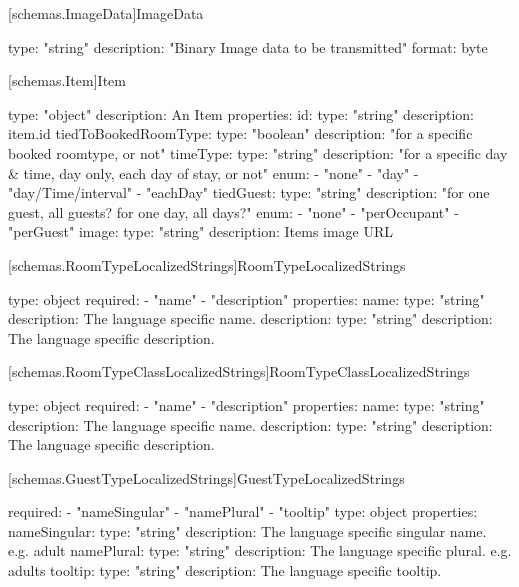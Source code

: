 [schemas.ImageData]{ImageData}
\begin{codeblock}
  type: "string"
  description: "Binary Image data to be transmitted"
  format: byte
\end{codeblock}

[schemas.Item]{Item}
\begin{codeblock}
  type: "object"
  description: An Item
  properties:
    id:
      type: "string"
      description: item.id
    tiedToBookedRoomType:
      type: "boolean"
      description: "for a specific booked roomtype, or not"
    timeType:
      type: "string"
      description: "for a specific day & time, day only, each day of stay, or not"
      enum:
      - "none"
      - "day"
      - "day/Time/interval"
      - "eachDay"
    tiedGuest:
      type: "string"
      description: "for one guest, all guests? for one day, all days?"
      enum:
      - "none"
      - "perOccupant"
      - "perGuest"
    image:
      type: "string"
      description: Items image URL
\end{codeblock}

[schemas.RoomTypeLocalizedStrings]{RoomTypeLocalizedStrings}
\begin{codeblock}
  type: object
  required:
    - "name"
    - "description"
  properties:
     name:
        type: "string"
        description: The language specific name. 
     description:
        type: "string"
        description: The language specific description.
\end{codeblock}

[schemas.RoomTypeClassLocalizedStrings]{RoomTypeClassLocalizedStrings}
\begin{codeblock}
  type: object
  required:
    - "name"
    - "description"
  properties:
     name:
        type: "string"
        description: The language specific name. 
     description:
        type: "string"
        description: The language specific description.
\end{codeblock}

[schemas.GuestTypeLocalizedStrings]{GuestTypeLocalizedStrings}
\begin{codeblock}
  required:
    - "nameSingular"
    - "namePlural"
    - "tooltip"
  type: object
  properties:
    nameSingular:
      type: "string"
      description: The language specific singular name. e.g. adult
    namePlural:
      type: "string"
      description: The language specific plural. e.g. adults
    tooltip:
      type: "string"
      description: The language specific tooltip. 
\end{codeblock}

